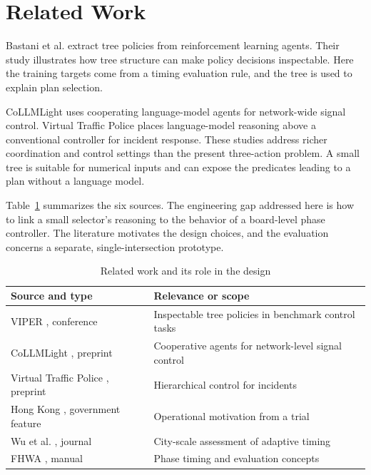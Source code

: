 \section{Related Work}
Bastani et al. \cite{bastani} extract tree policies from reinforcement learning agents. Their study illustrates how tree structure can make policy decisions inspectable. Here the training targets come from a timing evaluation rule, and the tree is used to explain plan selection.

CoLLMLight \cite{yuan} uses cooperating language-model agents for network-wide signal control. Virtual Traffic Police \cite{wei} places language-model reasoning above a conventional controller for incident response. These studies address richer coordination and control settings than the present three-action problem. A small tree is suitable for numerical inputs and can expose the predicates leading to a plan without a language model.

Table~\ref{tab:work} summarizes the six sources. The engineering gap addressed here is how to link a small selector's reasoning to the behavior of a board-level phase controller. The literature motivates the design choices, and the evaluation concerns a separate, single-intersection prototype.

\begin{table}[t]
\caption{Related work and its role in the design}
\label{tab:work}\centering\footnotesize
\begin{tabular}{@{}p{}p{}@{}}
\toprule Source and type & Relevance or scope\\ \midrule
VIPER \cite{bastani}, conference & Inspectable tree policies in benchmark control tasks\\
CoLLMLight \cite{yuan}, preprint & Cooperative agents for network-level signal control\\
Virtual Traffic Police \cite{wei}, preprint & Hierarchical control for incidents\\
Hong Kong \cite{hk}, government feature & Operational motivation from a trial\\
Wu et al. \cite{wu}, journal & City-scale assessment of adaptive timing\\
FHWA \cite{koonce}, manual & Phase timing and evaluation concepts\\
\bottomrule
\end{tabular}
\end{table}
